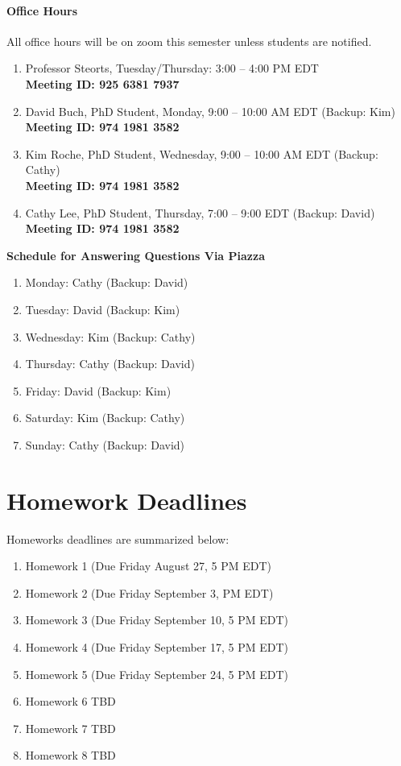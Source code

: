 \documentclass[11pt]{article}
\begin{document}
\paragraph{Office Hours}
All office hours will be on zoom this semester unless students are notified.
\begin{enumerate}
\item Professor Steorts, Tuesday/Thursday: 3:00 -- 4:00 PM EDT \\
\textbf{Meeting ID: 925 6381 7937}
\item David Buch, PhD Student, Monday, 9:00 -- 10:00 AM EDT  (Backup: Kim)\\
\textbf{Meeting ID: 974 1981 3582}
\item Kim Roche, PhD Student, Wednesday, 9:00 -- 10:00 AM EDT  (Backup: Cathy)\\
\textbf{Meeting ID: 974 1981 3582}
\item Cathy Lee, PhD Student, Thursday, 7:00 -- 9:00 EDT (Backup: David)\\
\textbf{Meeting ID: 974 1981 3582}
\end{enumerate}


\textbf{Schedule for Answering Questions Via Piazza}
\begin{enumerate}
\item Monday: Cathy (Backup: David)
\item Tuesday: David (Backup: Kim)
\item Wednesday: Kim (Backup: Cathy)
\item Thursday: Cathy (Backup: David)
\item Friday: David (Backup: Kim)
\item Saturday: Kim (Backup: Cathy)
\item Sunday: Cathy (Backup: David)
\end{enumerate}


\section{Homework Deadlines}
Homeworks deadlines are summarized below:

\begin{enumerate}
\item Homework 1 (Due Friday August 27, 5 PM EDT)
\item Homework 2 (Due Friday September 3, PM EDT)
\item Homework 3 (Due Friday September 10, 5 PM EDT)
\item Homework 4 (Due Friday September 17, 5 PM EDT)
\item Homework 5 (Due Friday September 24, 5 PM EDT)
\item Homework 6 TBD
\item Homework 7 TBD
\item Homework 8 TBD
\end{enumerate} 
\end{document}
